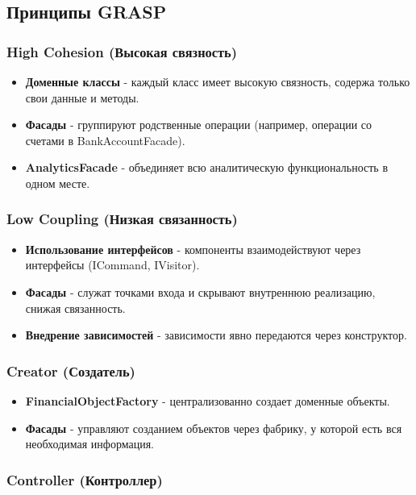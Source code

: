 \documentclass[12pt,a4paper]{article}
\begin{document}
\subsection{Принципы GRASP}

\subsubsection{High Cohesion (Высокая связность)}

\begin{itemize}
    \item \textbf{Доменные классы} - каждый класс имеет высокую связность, содержа только свои данные и методы.
    \item \textbf{Фасады} - группируют родственные операции (например, операции со счетами в BankAccountFacade).
    \item \textbf{AnalyticsFacade} - объединяет всю аналитическую функциональность в одном месте.
\end{itemize}

\subsubsection{Low Coupling (Низкая связанность)}

\begin{itemize}
    \item \textbf{Использование интерфейсов} - компоненты взаимодействуют через интерфейсы (ICommand, IVisitor).
    \item \textbf{Фасады} - служат точками входа и скрывают внутреннюю реализацию, снижая связанность.
    \item \textbf{Внедрение зависимостей} - зависимости явно передаются через конструктор.
\end{itemize}

\subsubsection{Creator (Создатель)}

\begin{itemize}
    \item \textbf{FinancialObjectFactory} - централизованно создает доменные объекты.
    \item \textbf{Фасады} - управляют созданием объектов через фабрику, у которой есть вся необходимая информация.
\end{itemize}

\subsubsection{Controller (Контроллер)}
\end{document}
